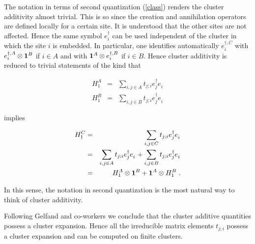 The notation in terms of second quantization (\ref{class}) renders 
the cluster additivity almost trivial. This is so since the creation and
annihilation operators are defined locally for a certain site. It is understood
that the other sites are not affected. Hence the same symbol $e^\dagger_i$
can be  used independent of the cluster in which the site $i$ is embedded.
In particular, one identifies automatically $e^{\dagger,C}_i$ with 
$e^{\dagger,A}_i\otimes {\bf 1}^B$ if $i\in A$ and with  
${\bf 1}^A\otimes e^{\dagger,B}_i$ if $i\in B$.
Hence cluster additivity is reduced to trivial statements of the kind that
\begin{mathletters}
\begin{eqnarray}
H_1^A &=& \sum_{i,j\in A}  t_{j;i}e_{j}^{\dagger}e_{i}^{\phantom\dagger}\\
H_1^B &=& \sum_{i,j\in B}  t_{j;i}e_{j}^{\dagger}e_{i}^{\phantom\dagger}
\end{eqnarray}
\end{mathletters}
implies
\begin{mathletters}
\begin{eqnarray}
H_1^C &=& \sum_{i,j\in C}  t_{j;i}e_{j}^{\dagger}e_{i}^{\phantom\dagger}\\
&=& \sum_{i,j\in A}  t_{j;i}e_{j}^{\dagger}e_{i}^{\phantom\dagger} +
 \sum_{i,j\in B}  t_{j;i}e_{j}^{\dagger}e_{i}^{\phantom\dagger}\\
&=& H_1^A\otimes {\bf 1}^B + {\bf 1}^A\otimes H_1^B\ .
\end{eqnarray}
\end{mathletters}
In this sense, the notation in second quantization is the most natural
way to think of cluster additivity.

Following Gelfand and co-workers \cite{gelfa00,gelfa90,gelfa96}
 we conclude that the cluster additive quantities possess a cluster expansion.
 Hence all the irreducible matrix elements
$t_{j;i}$ possess a cluster expansion and can be computed on finite clusters.


